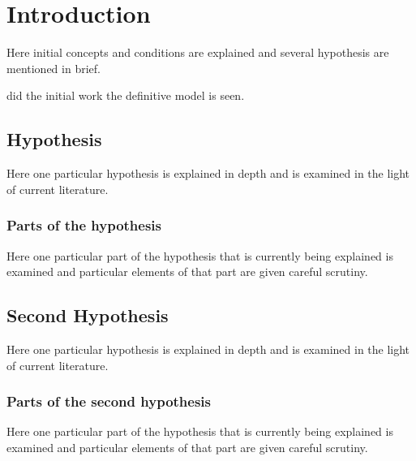 \section{Introduction}

Here initial concepts and conditions are explained and
several hypothesis are mentioned in brief.

did the initial work
the definitive model is seen.

\subsection{Hypothesis}

Here one particular hypothesis is explained in depth
and is examined in the light of current literature.

\subsubsection{Parts of the hypothesis}

Here one particular part of the hypothesis that is
currently being explained is examined and particular
elements of that part are given careful scrutiny.


\subsection{Second Hypothesis}

Here one particular hypothesis is explained in depth
and is examined in the light of current literature.

\subsubsection{Parts of the second hypothesis}

Here one particular part of the hypothesis that is
currently being explained is examined and particular
elements of that part are given careful scrutiny.



